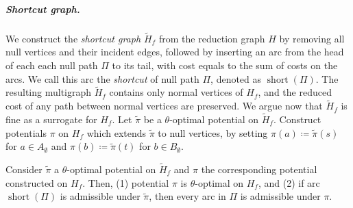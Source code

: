 \documentclass[a4paper,UKenglish]{socg-lipics-v2018}
\makeatletter
\def\short{\operatorname{short}}
\theoremstyle{plain}
\numberwithin{figure}{section}
\renewcommand{\paragraph}{\subparagraph}
\def\EMPH#1{\textcolor{BrickRed}{{\emph{#1}}}}
\def\n@te#1{\textsf{\boldmath \textbf{$\langle\!\langle$#1$\rangle\!\rangle$}}\leavevmode}
\def\note#1{\textcolor{red}{\n@te{#1}}}
\makeatother
\begin{document}
\paragraph{Shortcut graph.}
We construct the \EMPH{shortcut graph $\tilde{H}_f$} from the reduction graph $H$ by removing all
null vertices and their incident edges, followed by inserting an arc
from the head of each each null path $\Pi$ to its tail, with cost equals to the sum of costs on the arcs.
We call this arc the \EMPH{shortcut} of null path $\Pi$, denoted as \EMPH{$\short(\Pi)$}.
%
The resulting multigraph $\tilde{H}_f$ contains only normal vertices of $H_f$, and the reduced cost of any path between normal vertices are preserved.
%
We argue now that $\tilde{H}_f$ is fine as a surrogate for $H_f$.
%
Let $\tilde{\pi}$ be a $\theta$-optimal potential on $\tilde{H}_f$.
Construct potentials $\pi$ on $H_f$ which extends $\tilde{\pi}$ to null vertices, by
setting $\pi(a) \coloneqq \tilde{\pi}(s)$ for $a \in A_\emptyset$ and
$\pi(b) \coloneqq \tilde{\pi}(t)$ for $b \in B_\emptyset$.

\begin{lemmarep}
\label{lemma:empty_correct}
Consider $\tilde{\pi}$ a $\theta$-optimal potential on $\tilde{H}_f$ and $\pi$ the corresponding potential constructed on $H_f$.
Then,
(1) potential $\pi$ is $\theta$-optimal on $H_f$, and
(2) if arc $\short(\Pi)$ is admissible under $\tilde{\pi}$, then every arc in $\Pi$ is admissible under $\pi$.
\end{lemmarep}
\end{document}
